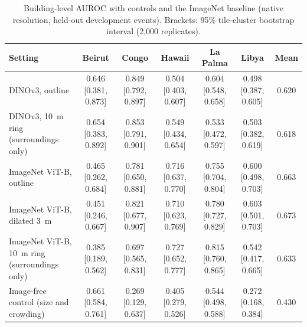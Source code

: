 \documentclass{ieeeaccess}
\begin{document}
\begin{table}[t]
\centering
\caption{Building-level AUROC with controls and the ImageNet baseline (native resolution, held-out development events). Brackets: 95\% tile-cluster bootstrap interval (2,000 replicates).}
\label{tab:controls}
\scriptsize
\setlength{\tabcolsep}{3pt}
\begin{tabular}{@{}lcccccc@{}}
\toprule
Setting & Beirut & Congo & Hawaii & La Palma & Libya & Mean \\
\midrule
DINOv3, outline & 0.646 [0.381, 0.873] & 0.849 [0.792, 0.897] & 0.504 [0.403, 0.607] & 0.604 [0.548, 0.658] & 0.498 [0.387, 0.605] & 0.620 \\
DINOv3, 10~m ring (surroundings only) & 0.654 [0.383, 0.892] & 0.853 [0.791, 0.901] & 0.549 [0.434, 0.654] & 0.533 [0.472, 0.597] & 0.503 [0.382, 0.619] & 0.618 \\
ImageNet ViT-B, outline & 0.465 [0.262, 0.684] & 0.781 [0.650, 0.881] & 0.716 [0.637, 0.770] & 0.755 [0.704, 0.804] & 0.600 [0.498, 0.703] & 0.663 \\
ImageNet ViT-B, dilated 3~m & 0.451 [0.246, 0.667] & 0.821 [0.677, 0.907] & 0.710 [0.623, 0.769] & 0.780 [0.727, 0.829] & 0.603 [0.501, 0.703] & 0.673 \\
ImageNet ViT-B, 10~m ring (surroundings only) & 0.385 [0.189, 0.562] & 0.697 [0.565, 0.831] & 0.727 [0.652, 0.777] & 0.815 [0.760, 0.865] & 0.542 [0.417, 0.665] & 0.633 \\
Image-free control (size and crowding) & 0.661 [0.584, 0.761] & 0.269 [0.129, 0.637] & 0.405 [0.279, 0.526] & 0.544 [0.498, 0.588] & 0.272 [0.168, 0.384] & 0.430 \\
\bottomrule
\end{tabular}
\end{table}

\begin{table}[t]
\centering
\caption{Event-level comparisons with controls and the ImageNet baseline (5 events, 95\% t-interval; $p$: exact sign-flip test, smallest attainable 0.0625).}
\label{tab:cmp2}
\footnotesize
{}
\end{table}
\end{document}
